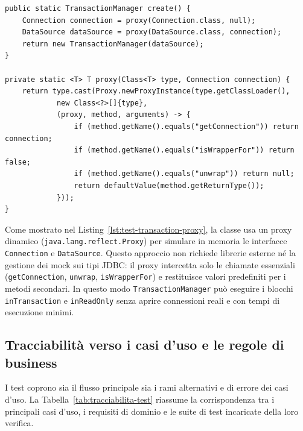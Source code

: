 \begin{lstlisting}[caption={Creazione di \texttt{TransactionManager} isolato tramite proxy dinamici JDK.}, label={lst:test-transaction-proxy}]
public static TransactionManager create() {
    Connection connection = proxy(Connection.class, null);
    DataSource dataSource = proxy(DataSource.class, connection);
    return new TransactionManager(dataSource);
}

private static <T> T proxy(Class<T> type, Connection connection) {
    return type.cast(Proxy.newProxyInstance(type.getClassLoader(), 
            new Class<?>[]{type},
            (proxy, method, arguments) -> {
                if (method.getName().equals("getConnection")) return connection;
                if (method.getName().equals("isWrapperFor")) return false;
                if (method.getName().equals("unwrap")) return null;
                return defaultValue(method.getReturnType());
            }));
}
\end{lstlisting}

Come mostrato nel Listing~\ref{lst:test-transaction-proxy}, la classe usa un proxy dinamico (\texttt{java.lang.reflect.Proxy}) per simulare in memoria le interfacce \texttt{Connection} e \texttt{DataSource}.
Questo approccio non richiede librerie esterne né la gestione dei mock sui tipi JDBC: il proxy intercetta solo le chiamate essenziali (\texttt{getConnection}, \texttt{unwrap}, \texttt{isWrapperFor}) e restituisce valori predefiniti per i metodi secondari. In questo modo \texttt{TransactionManager} può eseguire i blocchi \texttt{inTransaction} e \texttt{inReadOnly} senza aprire connessioni reali e con tempi di esecuzione minimi.

\subsection{Tracciabilità verso i casi d'uso e le regole di business}
\label{sec:tracciabilita-test}
I test coprono sia il flusso principale sia i rami alternativi e di errore dei casi d'uso.
La Tabella~\ref{tab:tracciabilita-test} riassume la corrispondenza tra i principali casi d'uso, i requisiti di dominio e le suite di test incaricate della loro verifica.

